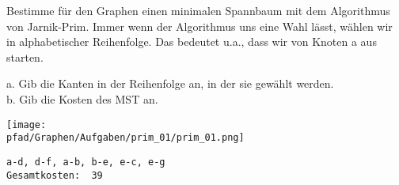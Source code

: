 ﻿\question[3]
Bestimme für den Graphen einen minimalen Spannbaum mit dem Algorithmus von Jarnik-Prim. Immer wenn der Algorithmus uns eine
Wahl lässt, wählen wir in alphabetischer Reihenfolge. Das bedeutet u.a., dass wir von Knoten a aus starten.

a. Gib die Kanten in der Reihenfolge an, in der sie gewählt werden.  \\
b. Gib die Kosten des MST an.

\texttt{[image: \\pfad/Graphen/Aufgaben/prim\_01/prim\_01.png]}
\begin{solutionbox}{3cm}
\begin{lstlisting}
a-d, d-f, a-b, b-e, e-c, e-g
Gesamtkosten:  39
\end{lstlisting}
\end{solutionbox}
